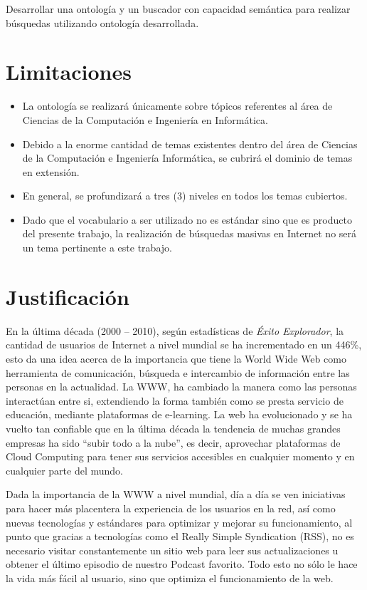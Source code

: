 Desarrollar una ontología y un buscador con capacidad semántica para realizar búsquedas utilizando ontología desarrollada.


\section{Limitaciones }

\begin{itemize}
\item La ontología se realizará únicamente sobre tópicos referentes al área de Ciencias de la Computación e Ingeniería en Informática.
\item Debido a la enorme cantidad de temas existentes dentro del área de Ciencias de la Computación e Ingeniería Informática, se cubrirá el dominio de temas en extensión.
\item En general, se profundizará a tres (3) niveles en todos los temas cubiertos.
\item Dado que el vocabulario a ser utilizado no es estándar sino que es producto del presente trabajo, la realización de búsquedas masivas en Internet no será un tema pertinente a este trabajo.

\end{itemize}

\newpage


\section{Justificación }

En la última década (2000 – 2010), según estadísticas de \textit{Éxito Explorador}, la cantidad de usuarios de Internet a nivel mundial se ha incrementado en un 446\%, esto da una idea acerca de la importancia que tiene la World Wide Web como herramienta de comunicación, búsqueda e intercambio de información entre las personas en la actualidad. La WWW, ha cambiado la manera como las personas interactúan entre si, extendiendo la forma también como se presta servicio de educación, mediante plataformas de e-learning. La web ha evolucionado y se ha vuelto tan confiable que en la última década la tendencia de muchas grandes empresas ha sido ``subir todo a la nube”, es decir, aprovechar plataformas de Cloud Computing para tener sus servicios accesibles en cualquier momento y en cualquier parte del mundo.

Dada la importancia de la WWW a nivel mundial, día a día se ven iniciativas para hacer más placentera la experiencia de los usuarios en la red, así como nuevas tecnologías y estándares para optimizar y mejorar su funcionamiento, al punto que gracias a tecnologías como el Really Simple Syndication (RSS), no es necesario visitar constantemente un sitio web para leer sus actualizaciones u obtener el último episodio de nuestro Podcast favorito. Todo esto no sólo le hace la vida más fácil al usuario, sino que optimiza el funcionamiento de la web.

